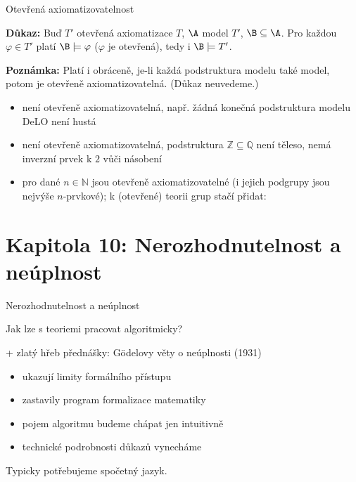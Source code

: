 \documentclass{beamer}
\begin{document}
\begin{frame}{Otevřená axiomatizovatelnost}

    \smallskip

    
    \textbf{Důkaz:}
    Buď $T'$ otevřená axiomatizace $T$, $\A$ model $T'$, $\B\subseteq\A$. Pro každou $\varphi\in T'$ platí $\B\models\varphi$ ($\varphi$ je otevřená), tedy i $\B\models T'$.  
    \hfill\qedsymbol

    \textbf{Poznámka:} Platí i obráceně, je-li každá podstruktura modelu také model, potom je otevřeně axiomatizovatelná. (Důkaz neuvedeme.)

    \begin{itemize}
        \item {} není otevřeně axiomatizovatelná, např. žádná konečná podstruktura modelu DeLO není hustá
        \item {} není otevřeně axiomatizovatelná, podstruktura $\mathbb Z\subseteq\mathbb Q$ není těleso, nemá inverzní prvek k $2$ vůči násobení
        \item pro dané $n\in\mathbb N$ jsou  otevřeně axiomatizovatelné (i jejich podgrupy jsou nejvýše $n$-prvkové); k (otevřené) teorii grup stačí přidat: 
    \end{itemize}

\end{frame}


\section{\sc Kapitola 10: Nerozhodnutelnost a neúplnost}


\begin{frame}{Nerozhodnutelnost a neúplnost}

    Jak lze s teoriemi pracovat algoritmicky?

    \medskip

    + zlatý hřeb přednášky: \alert{Gödelovy věty o neúplnosti} (1931)
    \begin{itemize}
        \item ukazují limity formálního přístupu
        \item zastavily program formalizace matematiky
        \item pojem \alert{algoritmu} budeme chápat jen intuitivně
        \item technické podrobnosti důkazů vynecháme
        
    \end{itemize}

    Typicky potřebujeme spočetný jazyk.
     
\end{frame}
\end{document}
